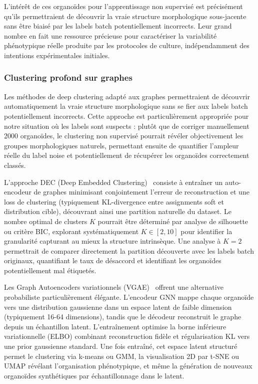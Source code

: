 L'intérêt de ces organoïdes pour l'apprentissage non supervisé est précisément qu'ils permettraient de découvrir la vraie structure morphologique sous-jacente sans être biaisé par les labels batch potentiellement incorrects. Leur grand nombre en fait une ressource précieuse pour caractériser la variabilité phénotypique réelle produite par les protocoles de culture, indépendamment des intentions expérimentales initiales.

\subsubsection{Clustering profond sur graphes}

Les méthodes de deep clustering adapté aux graphes permettraient de découvrir automatiquement la vraie structure morphologique sans se fier aux labels batch potentiellement incorrects. Cette approche est particulièrement appropriée pour notre situation où les labels sont suspects : plutôt que de corriger manuellement 2000 organoïdes, le clustering non supervisé pourrait révéler objectivement les groupes morphologiques naturels, permettant ensuite de quantifier l'ampleur réelle du label noise et potentiellement de récupérer les organoïdes correctement classés.

L'approche DEC (Deep Embedded Clustering)~\cite{Xie2016} consiste à entraîner un auto-encodeur de graphes minimisant conjointement l'erreur de reconstruction et une loss de clustering (typiquement KL-divergence entre assignments soft et distribution cible), découvrant ainsi une partition naturelle du dataset. Le nombre optimal de clusters $K$ pourrait être déterminé par analyse de silhouette ou critère BIC, explorant systématiquement $K \in [2, 10]$ pour identifier la granularité capturant au mieux la structure intrinsèque. Une analyse à $K=2$ permettrait de comparer directement la partition découverte avec les labels batch originaux, quantifiant le taux de désaccord et identifiant les organoïdes potentiellement mal étiquetés.

Les Graph Autoencoders variationnels (VGAE)~\cite{Kipf2016} offrent une alternative probabiliste particulièrement élégante. L'encodeur GNN mappe chaque organoïde vers une distribution gaussienne dans un espace latent de faible dimension (typiquement 16-64 dimensions), tandis que le décodeur reconstruit le graphe depuis un échantillon latent. L'entraînement optimise la borne inférieure variationnelle (ELBO) combinant reconstruction fidèle et régularisation KL vers une prior gaussienne standard. Une fois entraîné, cet espace latent structuré permet le clustering via k-means ou GMM, la visualisation 2D par t-SNE ou UMAP révélant l'organisation phénotypique, et même la génération de nouveaux organoïdes synthétiques par échantillonnage dans le latent.

